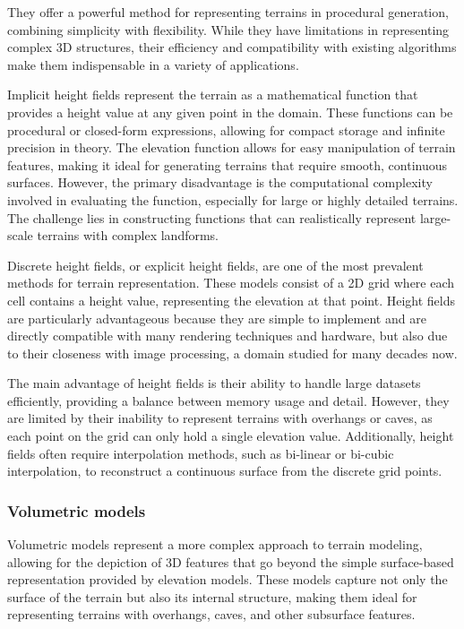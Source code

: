 They offer a powerful method for representing terrains in procedural generation, combining simplicity with flexibility. While they have limitations in representing complex 3D structures, their efficiency and compatibility with existing algorithms make them indispensable in a variety of applications.

Implicit height fields represent the terrain as a mathematical function that provides a height value at any given point in the domain. These functions can be procedural or closed-form expressions, allowing for compact storage and infinite precision in theory. The elevation function allows for easy manipulation of terrain features, making it ideal for generating terrains that require smooth, continuous surfaces. However, the primary disadvantage is the computational complexity involved in evaluating the function, especially for large or highly detailed terrains. The challenge lies in constructing functions that can realistically represent large-scale terrains with complex landforms.

Discrete height fields, or explicit height fields, are one of the most prevalent methods for terrain representation. These models consist of a 2D grid where each cell contains a height value, representing the elevation at that point. Height fields are particularly advantageous because they are simple to implement and are directly compatible with many rendering techniques and hardware, but also due to their closeness with image processing, a domain studied for many decades now.

The main advantage of height fields is their ability to handle large datasets efficiently, providing a balance between memory usage and detail. However, they are limited by their inability to represent terrains with overhangs or caves, as each point on the grid can only hold a single elevation value. Additionally, height fields often require interpolation methods, such as bi-linear or bi-cubic interpolation, to reconstruct a continuous surface from the discrete grid points. 

\subsubsection{Volumetric models}
Volumetric models represent a more complex approach to terrain modeling, allowing for the depiction of 3D features that go beyond the simple surface-based representation provided by elevation models. These models capture not only the surface of the terrain but also its internal structure, making them ideal for representing terrains with overhangs, caves, and other subsurface features. 

